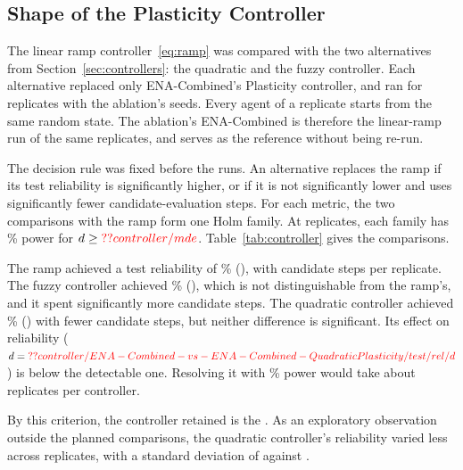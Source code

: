 \subsection{Shape of the Plasticity Controller}
\label{sec:controller}
The linear ramp controller~\eqref{eq:ramp} was compared with the two alternatives from Section~\ref{sec:controllers}: the quadratic and the fuzzy controller. Each alternative replaced only ENA-Combined's Plasticity controller, and ran for  replicates with the ablation's seeds. Every agent of a replicate starts from the same random state. The ablation's ENA-Combined is therefore the linear-ramp run of the same replicates, and serves as the reference without being re-run.

The decision rule was fixed before the runs. An alternative replaces the ramp if its test reliability is significantly higher, or if it is not significantly lower and uses significantly fewer candidate-evaluation steps. For each metric, the two comparisons with the ramp form one Holm family. At  replicates, each family has \% power for $d \ge \Res{controller/mde}$. Table~\ref{tab:controller} gives the comparisons.

The ramp achieved a test reliability of \% (), with  candidate steps per replicate. The fuzzy controller achieved \% (), which is not distinguishable from the ramp's, and it spent significantly more candidate steps. The quadratic controller achieved \% () with fewer candidate steps, but neither difference is significant. Its effect on reliability ($d = \Res{controller/ENA-Combined-vs-ENA-Combined-QuadraticPlasticity/test/rel/d}$) is below the detectable one. Resolving it with \% power would take about  replicates per controller.

By this criterion, the controller retained is the . As an exploratory observation outside the planned comparisons, the quadratic controller's reliability varied less across replicates, with a standard deviation of  against .

